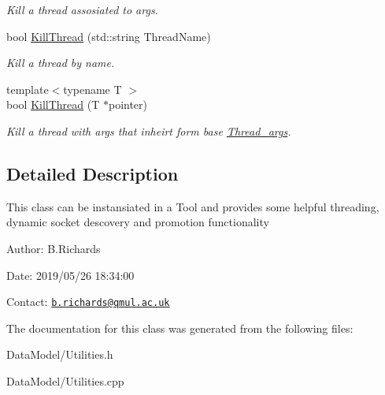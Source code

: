 \begin{DoxyCompactItemize}
\begin{DoxyCompactList}\small\item\em Kill a thread assosiated to args. \end{DoxyCompactList}\item 
\hypertarget{classUtilities_a8c17a46ce33b0b647797f24bc859bd7a}{bool \hyperlink{classUtilities_a8c17a46ce33b0b647797f24bc859bd7a}{Kill\-Thread} (std\-::string Thread\-Name)}\label{classUtilities_a8c17a46ce33b0b647797f24bc859bd7a}

\begin{DoxyCompactList}\small\item\em Kill a thread by name. \end{DoxyCompactList}\item 
\hypertarget{classUtilities_af4091a68d8a27a3b806d029cc9b2135e}{{\footnotesize template$<$typename T $>$ }\\bool \hyperlink{classUtilities_af4091a68d8a27a3b806d029cc9b2135e}{Kill\-Thread} (T $\ast$pointer)}\label{classUtilities_af4091a68d8a27a3b806d029cc9b2135e}

\begin{DoxyCompactList}\small\item\em Kill a thread with args that inheirt form base \hyperlink{structThread__args}{Thread\-\_\-args}. \end{DoxyCompactList}\end{DoxyCompactItemize}


\subsection{Detailed Description}
This class can be instansiated in a Tool and provides some helpful threading, dynamic socket descovery and promotion functionality

\begin{DoxyParagraph}{Author\-:}
B.\-Richards 
\end{DoxyParagraph}
\begin{DoxyParagraph}{Date\-:}
2019/05/26 18\-:34\-:00 
\end{DoxyParagraph}
Contact\-: \href{mailto:b.richards@qmul.ac.uk}{\tt b.\-richards@qmul.\-ac.\-uk} 

The documentation for this class was generated from the following files\-:\begin{DoxyCompactItemize}
\item 
Data\-Model/Utilities.\-h\item 
Data\-Model/Utilities.\-cpp\end{DoxyCompactItemize}
